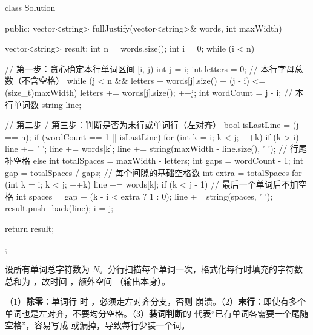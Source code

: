 \begin{cpp}
class Solution {
public:
    vector<string> fullJustify(vector<string>& words, int maxWidth) {
        vector<string> result;
        int n = words.size();
        int i = 0;
        while (i < n) {
            // 第一步：贪心确定本行单词区间 [i, j)
            int j = i;
            int letters = 0;              // 本行字母总数（不含空格）
            while (j < n &&
                   letters + words[j].size() + (j - i) <= (size_t)maxWidth) {
                letters += words[j].size();
                ++j;
            }
            int wordCount = j - i;        // 本行单词数
            string line;

            // 第二步 / 第三步：判断是否为末行或单词行（左对齐）
            bool isLastLine = (j == n);
            if (wordCount == 1 || isLastLine) {
                for (int k = i; k < j; ++k) {
                    if (k > i) line += ' ';
                    line += words[k];
                }
                line += string(maxWidth - line.size(), ' '); // 行尾补空格
            } else {
                int totalSpaces = maxWidth - letters;
                int gaps = wordCount - 1;
                int gap = totalSpaces / gaps;     // 每个间隙的基础空格数
                int extra = totalSpaces %
                for (int k = i; k < j; ++k) {
                    line += words[k];
                    if (k < j - 1) {              // 最后一个单词后不加空格
                        int spaces = gap + (k - i < extra ? 1 : 0);
                        line += string(spaces, ' ');
                    }
                }
            }
            result.push_back(line);
            i = j;
        }
        return result;
    }
};
\end{cpp}

\begin{keypoint}[复杂度]
设所有单词总字符数为 $N$。分行扫描每个单词一次，格式化每行时填充的字符数总和为 ，故时间 ，额外空间 （输出本身）。
\end{keypoint}

\begin{pitfall}[三类边界]
（1）\textbf{除零}：单词行  时 ，必须走左对齐分支，否则  崩溃。（2）\textbf{末行}：即使有多个单词也是左对齐，不要均分空格。（3）\textbf{装词判断}的  代表“已有单词各需要一个尾随空格”，容易写成  或漏掉，导致每行少装一个词。
\end{pitfall}

